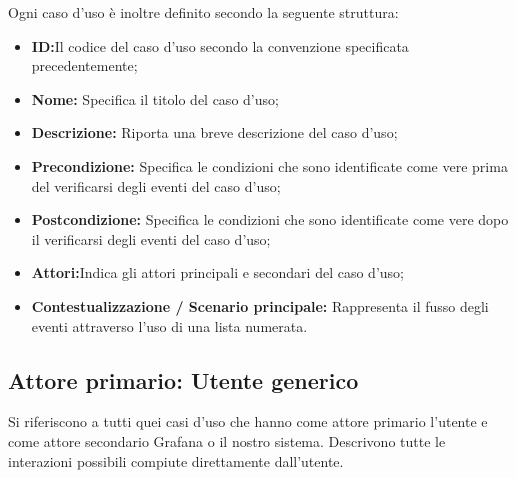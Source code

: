         \newline
        Ogni caso d'uso è inoltre definito secondo la seguente struttura:
         \begin{itemize}
           \item \textbf{ID:}Il codice del caso d'uso secondo la convenzione specificata precedentemente;
           \item \textbf{Nome:} Specifica il titolo del caso d'uso;
           \item \textbf{Descrizione:} Riporta una breve descrizione del caso d'uso;
           \item \textbf{Precondizione:} Specifica le condizioni che sono identificate come vere
prima del verificarsi degli eventi del caso d'uso;
           \item \textbf{Postcondizione:} Specifica le condizioni che sono identificate come
vere dopo il verificarsi degli eventi del caso d'uso;
		   \item \textbf{Attori:}Indica gli attori principali e secondari del caso d'uso;
           \item \textbf{Contestualizzazione / Scenario principale:} Rappresenta il fusso degli eventi attraverso l'uso di una lista numerata.
         \end{itemize}

		\subsection{Attore primario: Utente generico}
		Si riferiscono a tutti quei casi d'uso che hanno come attore primario l'utente e come attore secondario Grafana o il nostro sistema. Descrivono tutte le interazioni possibili compiute direttamente dall'utente.
		
